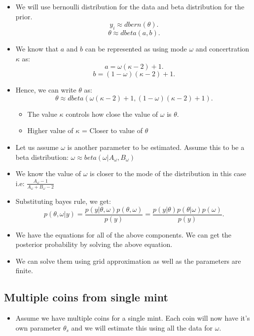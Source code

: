 \documentclass{article}
\begin{document}
\begin{itemize}
    \item We will use bernoulli distribution for the data and beta distribution for the prior. \[
            y_{i} \approx dbern(\theta) 
        .\] 
        \[
            \theta \approx dbeta(a, b)
        .\] 
    \item We know that $a$ and $b$ can be represented as using mode $\omega$ and concertration $\kappa$ as:
        \[
            a = \omega(\kappa-2)+1 
        .\] 
        \[
            b = (1-\omega)(\kappa - 2) + 1 
        .\] 
    \item Hence, we can write $\theta$ as:
        \[
            \theta \approx dbeta(\omega(\kappa-2)+1, (1-\omega)(\kappa - 2) + 1)
        .\] 
        \begin{itemize}
            \item The value $\kappa$ controls how close the value of  $\omega$ is  $\theta$.
            \item Higher value of $\kappa$ = Closer to value of $\theta$
        \end{itemize}
    \item Let us assume $\omega$ is another parameter to be estimated. Assume this to be a beta distribution: $\omega \approx beta(\omega | A_{\omega}, B{_\omega})$
    \item We know the value of $\omega$ is closer to the mode of the distribution in this case i.e: $\frac{A_{\omega}-1}{A_{\omega}+B_{\omega}-2}$
    \item Substituting bayes rule, we get:
        \[
            p(\theta, \omega | y) = \frac{p(y | \theta, \omega) p(\theta, \omega)}{p(y)}            
            = \frac{p(y|\theta)p(\theta|\omega)p(\omega)}{p(y)}
        .\] 
    \item We have the equations for all of the above components. We can get the posterior probability by solving the above equation.
    \item We can solve them using grid approximation as well as the parameters are finite. 
\end{itemize}

\subsection{Multiple coins from single mint} 
\begin{itemize}
    \item Assume we have multiple coins for a single mint. Each coin will now have it's own parameter $\theta_{s}$ and we will estimate this using all the data for $\omega$. 
\end{itemize}
\end{document}
